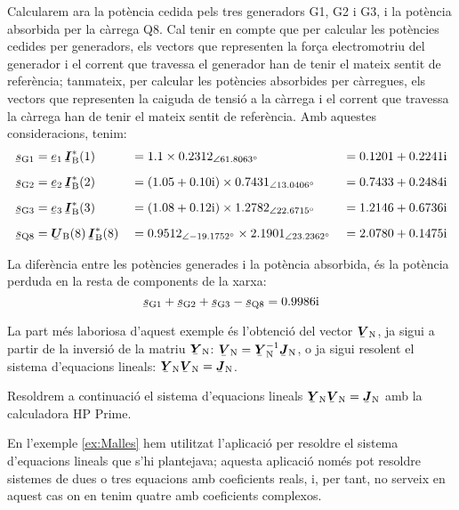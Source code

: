 \begin{exemple}
    Calcularem ara la potència cedida pels tres generadors G1, G2 i G3, i la potència absorbida per la càrrega Q8. Cal tenir en compte que per calcular les potències cedides per generadors, els vectors que representen la força electromotriu del generador i el corrent que travessa el generador han de tenir el mateix sentit de referència; tanmateix, per calcular les potències absorbides per càrregues, els vectors que representen la caiguda de tensió a la càrrega i el corrent que travessa la càrrega han de tenir el mateix sentit de referència. Amb aquestes consideracions, tenim:
    \begin{alignat*}{3}
       \cmplx{s}\ped{G1} &= \cmplx{e}\ped{1} \, \mcmplx{I}\ped{B}^*(1) &&= \num{1,1} \times
        \numpd{0,2312}{61,8063} &&= \complexnum{0,1201 + j 0,2241} \\[2mm]
       \cmplx{s}\ped{G2} &= \cmplx{e}\ped{2} \, \mcmplx{I}\ped{B}^*(2) &&=
       (\complexnum{1,05 + j 0,10}) \times \numpd{0,7431}{13,0406} &&=
       \complexnum{0,7433 + j 0,2484} \\[2mm]
       \cmplx{s}\ped{G3} &= \cmplx{e}\ped{3} \, \mcmplx{I}\ped{B}^*(3) &&=
       (\complexnum{1,08 + j 0,12}) \times \numpd{1,2782}{22,6715} &&=
       \complexnum{1,2146 + j 0,6736}  \\[2mm]
       \cmplx{s}\ped{Q8} &= \mcmplx{U}\ped{B}(8) \, \mcmplx{I}\ped{B}^*(8) &&=
      \numpd{0,9512}{-19,1752} \times \numpd{2,1901}{23,2362}    &&=
      \complexnum{2,0780 + j 0,1475}
    \end{alignat*}

    La diferència entre les potències generades i la potència absorbida, és la potència perduda en la resta de components de la xarxa:
    \[
       \cmplx{s}\ped{G1} + \cmplx{s}\ped{G2} + \cmplx{s}\ped{G3} -
       \cmplx{s}\ped{Q8} = \complexnum{j 0,9986}
    \]

    La part més laboriosa d'aquest exemple és l'obtenció del vector $\mcmplx{V}\ped{N}$, ja sigui a partir de la inversió de la matriu $\mcmplx{Y}\ped{N}$: $\mcmplx{V}\ped{N} = \mcmplx{Y}\ped{N}^{-1} \mcmplx{J}\ped{N}$, o ja sigui  resolent el sistema d'equacions lineals: $\mcmplx{Y}\ped{N}  \mcmplx{V}\ped{N} = \mcmplx{J}\ped{N}$.

    Resoldrem a continuació el sistema d'equacions lineals $\mcmplx{Y}\ped{N} \mcmplx{V}\ped{N} = \mcmplx{J}\ped{N}$ amb la calculadora \textsf{HP Prime}.

    En l'exemple \vref{ex:Malles} hem utilitzat l'aplicació  per resoldre el sistema d'equacions lineals que s'hi plantejava;  aquesta aplicació només pot resoldre sistemes de dues o tres equacions amb coeficients reals, i, per tant, no serveix en aquest cas on en tenim quatre amb coeficients complexos.


\end{exemple}
